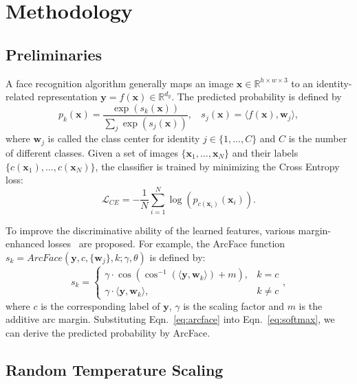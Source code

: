\documentclass[letterpaper]{article} %
\begin{document}
\section{Methodology}
\label{sec:method}

\subsection{Preliminaries}
\label{ssec:preliminary}
A face recognition algorithm generally maps an image $\bm{x} \in \mathbb{R}^{h\times w\times 3}$ to an identity-related representation $\bm{y} = f(\bm{x}) \in \mathbb{R}^{d_y}$. %
The predicted probability is defined by
\begin{equation}
p_k(\bm{x}) = \frac{\exp (s_k(\bm{x}))}{\sum_j \exp(s_j(\bm{x}))},~~~~s_j(\bm{x}) = \langle f(\bm{x}), \bm{w}_j\rangle,
\label{eq:softmax}
\end{equation}
where $\bm{w}_j$ is called the class center for identity $j \in \{1, \dots, C\}$ and $C$ is the number of different classes.
Given a set of images $\{\bm{x}_1,\dots, \bm{x}_N\}$ and their labels $\{c(\bm{x}_1), \dots, c(\bm{x}_N)\}$, the classifier is trained by minimizing the Cross Entropy loss:
\begin{equation}
\mathcal{L}_{CE} = -\frac{1}{N} \sum_{i = 1}^{N} \log \left(p_{c(\bm{x}_i)}(\bm{x}_i)\right).
\label{eq:cross_entropy}
\end{equation}

To improve the discriminative ability of the learned features, various margin-enhanced losses~\cite{deng2019arcface,wang2018cosface} are proposed. %
For example, the ArcFace function $s_k = ArcFace(\bm{y}, c, \{\bm{w}_j\}, k; \gamma, \theta)$ is defined by:
\begin{equation}
s_k =
\begin{cases}
\gamma \cdot \cos( \cos^{-1}( \langle \bm{y}, \bm{w}_k \rangle) + m), & k = c\\
\gamma \cdot \langle \bm{y}, \bm{w}_k \rangle, & k \neq c
\end{cases},
\label{eq:arcface}
\end{equation}
where $c$ is the corresponding label of $\bm{y}$, $\gamma$ is the scaling factor and $m$ is the additive arc margin.
Substituting Eqn.~\ref{eq:arcface} into Eqn.~\ref{eq:softmax}, we can derive the predicted probability by ArcFace.

\subsection{Random Temperature Scaling}
\label{ssec:rts}
\end{document}
